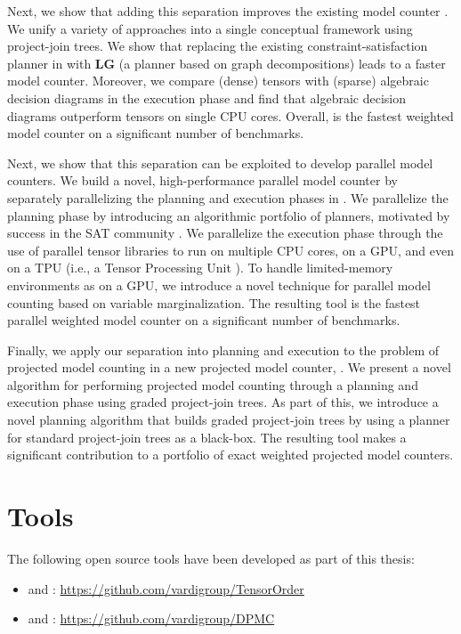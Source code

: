 Next, we show that adding this separation improves the existing model counter  \cite{DPV20,phan2019weighted}. We unify a variety of approaches into a single conceptual framework using project-join trees. We show that replacing the existing constraint-satisfaction planner in  with \textbf{LG} (a planner based on graph decompositions) leads to a faster model counter. Moreover, we compare (dense) tensors with (sparse) algebraic decision diagrams in the execution phase and find that algebraic decision diagrams outperform tensors on single CPU cores. Overall,  is the fastest weighted model counter on a significant number of benchmarks.

Next, we show that this separation can be exploited to develop parallel model counters. We build a novel, high-performance parallel model counter  by separately parallelizing the planning and execution phases in . We parallelize the planning phase by introducing an algorithmic portfolio of planners, motivated by success in the SAT community \cite{XHHL08}. We parallelize the execution phase through the use of parallel tensor libraries to run on multiple CPU cores, on a GPU, and even on a TPU (i.e., a Tensor Processing Unit \cite{JYPPABBBBB17}). To handle limited-memory environments as on a GPU, we introduce a novel technique for parallel model counting based on variable marginalization. 
The resulting tool  is the fastest parallel weighted model counter on a significant number of benchmarks.

Finally, we apply our separation into planning and execution to the problem of projected model counting in a new projected model counter, . 
We present a novel algorithm for performing projected model counting through a planning and execution phase using graded project-join trees. As part of this, we introduce a novel planning algorithm that builds graded project-join trees by using a planner for standard project-join trees as a black-box. The resulting tool  makes a significant contribution to a portfolio of exact weighted projected model counters.

\section{Tools}
The following open source tools have been developed as part of this thesis:
\begin{itemize}
    \item[]  and : \url{https://github.com/vardigroup/TensorOrder}
    \item[]  and : \url{https://github.com/vardigroup/DPMC}
\end{itemize}

